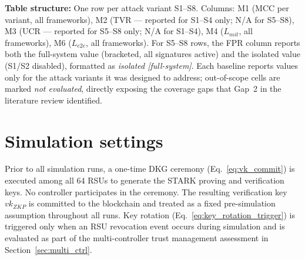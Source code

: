 \documentclass[12pt, a4paper]{report}
\begin{document}
{{\textbf{Table structure:} One row per attack variant
S1--S8. Columns: M1 (MCC per variant, all
frameworks), M2 (TVR --- reported for S1--S4 only;
N/A for S5--S8), M3 (UCR --- reported for S5--S8
only; N/A for S1--S4), M4 ($L_{mit}$, all
frameworks), M6 ($L_{e2e}$, all frameworks). For
S5--S8 rows, the \ac{FPR} column reports both the
full-system value (bracketed, all signatures active)
and the isolated value (S1/S2 disabled), formatted
as \textit{isolated [full-system]}. Each baseline
reports values only for the attack variants it was
designed to address; out-of-scope cells are marked
\textit{not evaluated}, directly exposing the
coverage gaps that Gap~2 in the literature review
identified.




\section{Simulation settings}
\label{sec:simulation}

Prior to all simulation runs, a one-time \ac{DKG}
ceremony (Eq.~\ref{eq:vk_commit}) is executed among
all 64 RSUs to generate the \ac{STARK} proving and
verification keys. No controller participates in the
ceremony. The resulting verification key $vk_{ZKP}$
is committed to the blockchain and treated as a fixed
pre-simulation assumption throughout all runs.
Key rotation (Eq.~\ref{eq:key_rotation_trigger}) is
triggered only when an RSU revocation event occurs
during simulation and is evaluated as part of the
multi-controller trust management assessment in
Section~\ref{sec:multi_ctrl}.

}}
\end{document}
